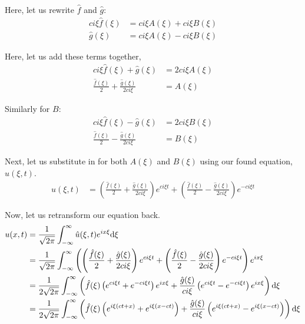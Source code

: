 Here, let us rewrite $\hat f$ and $\hat g$:
%
\begin{align}
  c i \xi \hat f(\xi) & = c i \xi A(\xi) + c i \xi B(\xi)\\
  \hat g(\xi) & = c i \xi A(\xi) - c i \xi B(\xi)
\end{align}

Here, let us add these terms together,
%
\begin{align}
  c i \xi \hat f(\xi) + \hat g(\xi) & = 2 c i \xi A(\xi)\\
  \frac{\hat f(\xi)}{2} + \frac{\hat g(\xi)}{2 ci \xi} & = A(\xi)
\end{align}

Similarly for $B$:
%
\begin{align}
  c i \xi \hat f(\xi) - \hat g(\xi) & = 2 c i \xi B(\xi)\\
  \frac{\hat f(\xi)}{2} - \frac{\hat g(\xi)}{2 ci \xi} & = B(\xi)
\end{align}

Next, let us substitute in for both $A(\xi)$ and $B(\xi)$ using our found equation, $\hat u(\xi, t)$.
%
\begin{align}
  \hat u(\xi, t) & =
  \left( \frac{\hat f(\xi)}{2} + \frac{\hat g(\xi)}{2 c i \xi} \right)e^{c i \xi t} +
  \left( \frac{\hat f(\xi)}{2} - \frac{\hat g(\xi)}{2 c i \xi} \right) e^{-c i \xi t}
\end{align}

Now, let us retransform our equation back.
%
\begin{align}
  u(x, t)
  & = \frac{1}{\sqrt{2 \pi}} \int^\infty_{-\infty}
  \hat u(\xi, t) e^{i x \xi} \text d\xi\\
  & = \frac{1}{\sqrt{2 \pi}} \int^\infty_{-\infty}
  \left(\left( \frac{\hat f(\xi)}{2} + \frac{\hat g(\xi)}{2 c i \xi} \right)e^{c i \xi t} +
  \left( \frac{\hat f(\xi)}{2} - \frac{\hat g(\xi)}{2 c i \xi} \right) e^{-c i \xi t}\right) e^{i x \xi}\\
  & = \frac{1}{2 \sqrt{2 \pi}} \int^\infty_{-\infty}
  \left( \hat f(\xi)\left(e^{c i \xi t} + e^{-c i \xi t} \right)e^{i x \xi} + \frac{\hat g(\xi)}{c i \xi}\left( e^{c i \xi t} - e^{-c i \xi t} \right) e^{i x \xi} \right) \text d\xi\\
  & =
  \frac{1}{2 \sqrt{2 \pi}} \int^\infty_{-\infty}
  \left(
  \hat f(\xi)\left(e^{i \xi(c t + x)} + e^{i \xi (x - c t)} \right) +
  \frac{\hat g(\xi)}{c i \xi}\left( e^{i \xi(c t + x)} - e^{i \xi (x - c t)} \right) \right) \text d\xi
\end{align}

